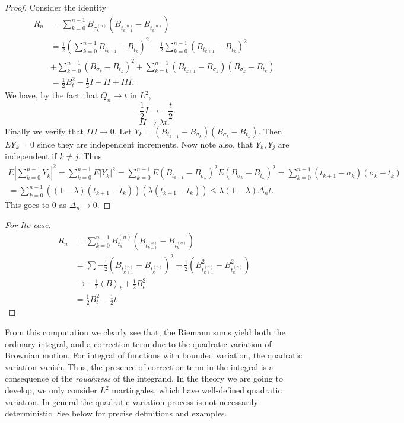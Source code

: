 \begin{proof}
	Consider the identity
	\begin{align*}
		R_n &= \sum_{k=0}^{n-1} B_{\sigma_k^{(n)}} \left( B_{t_{k+1}^{(n)}} - B_{t_k^{(n)}} \right)  \\
		&= \frac{1}{2} \left( \sum_{k=0}^{n-1} B_{t_{k+1}} - B_{t_k} \right) ^2 - \frac{1}{2} \sum_{k=0}^{n-1} \left( B_{t_{k+1}} - B_{t_k} \right) ^2 \\
		&+ \sum_{k=0}^{n-1} \left( B_{\sigma_k} - B_{t_k} \right) ^2 + \sum_{k=0}^{n-1} \left( B_{t_{k+1}} - B_{\sigma_k} \right) \left( B_{\sigma_k} - B_{t_k} \right) \\
		&= \frac{1}{2}B_t^2 - \frac{1}{2} I + II + III
	.\end{align*}
	We have, by the fact that $Q_n \to  t$ in $L^2$,
	\[
		- \frac{1}{2} I \to  - \frac{t}{2}
	.\] 
	\[
		II \to  \lambda t
	.\] 
	Finally we verify that $III \to  0$,
	Let $Y_k = \left( B_{t_{k+1}} - B_{\sigma_k} \right) \left( B_{\sigma_k} - B_{t_k} \right) $. Then $EY_k = 0$ since they are independent increments. Now note also, that $Y_k, Y_j$ are independent if $k \neq j$. Thus
	\begin{multline*}
		E| \sum_{k=0}^{n-1} Y_k |^2 
		= \sum_{k=0}^{n-1} E|Y_k|^2
		= \sum_{k=0}^{n-1} E\left( B_{t_{k+1}} - B_{\sigma_k} \right) ^2 E\left( B_{\sigma_k} - B_{t_k} \right) ^2
		= \sum_{k=0}^{n-1} (t_{k+1} - \sigma_k) (\sigma_k - t_k)\\
		= \sum_{k = 0}^{n - 1} \left( (1 - \lambda) (t_{k+1} - t_k) \right) \left( \lambda \left( t_{k+1} - t_k \right)  \right) 
		\le \lambda (1 - \lambda) \Delta_n t
	.\end{multline*} 
	This goes to $0$ as $\Delta_n \to  0$.

\end{proof}

\begin{proof}[For Ito case]
	\begin{align*}
		R_n &= \sum_{k = 0}^{n - 1}B_{t_k}^{(n)} \left( B_{t_{k+1}^{(n)}} - B_{t_k^{(n)}} \right) \\
		&= \sum - \frac{1}{2} (B_{t_{k+1}^{(n)}} - B_{t_k^{(n)}})^2 + \frac{1}{2} (B_{t_{k+1}^{(n)}}^2 - B_{t_k^{(n)}}^2) \\
		&\to - \frac{1}{2} \left\langle B\right\rangle_t + \frac{1}{2} B_t^2\\
		&= \frac{1}{2} B_t^2 - \frac{1}{2} t
	 \end{align*}
\end{proof}
From this computation we clearly see that, the Riemann sums yield both the ordinary integral, and a correction term due to the quadratic variation of Brownian motion. For integral of functions with bounded variation, the quadratic variation vanish. Thus, the presence of correction term in the integral is a consequence of the \textit{roughness} of the integrand. In the theory we are going to develop, we only consider $L^2$ martingales, which have well-defined quadratic variation. In general the quadratic variation process is not necessarily deterministic. See below for precise definitions and examples. 

